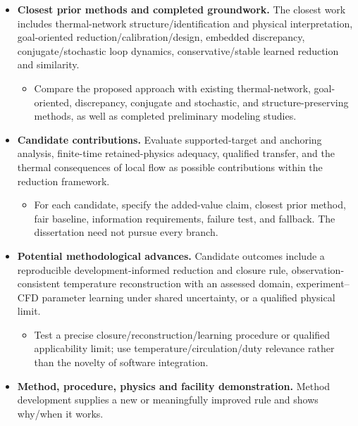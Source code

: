 \begin{itemize}[leftmargin=*]
\item {}\textbf{Closest prior methods and completed groundwork.} The closest work includes thermal-network structure/\allowbreak{}identification and physical interpretation, goal-oriented reduction/\allowbreak{}calibration/\allowbreak{}design, embedded discrepancy, conjugate/\allowbreak{}stochastic loop dynamics, conservative/\allowbreak{}stable learned reduction and similarity.\cite{fierro2026cfdoneD,raue2009identifiability}
\begin{itemize}
\item Compare the proposed approach with existing thermal-network, goal-oriented, discrepancy, conjugate and stochastic, and structure-preserving methods, as well as completed preliminary modeling studies.
\end{itemize}
\item {}\textbf{Candidate contributions.} Evaluate supported-target and anchoring analysis, finite-time retained-physics adequacy, qualified transfer, and the thermal consequences of local flow as possible contributions within the reduction framework.
\begin{itemize}
\item For each candidate, specify the added-value claim, closest prior method, fair baseline, information requirements, failure test, and fallback. The dissertation need not pursue every branch.
\end{itemize}
\item {}\textbf{Potential methodological advances.} Candidate outcomes include a reproducible development-informed reduction and closure rule, observation-consistent temperature reconstruction with an assessed domain, experiment--CFD parameter learning under shared uncertainty, or a qualified physical limit.
\begin{itemize}
\item Test a precise closure/\allowbreak{}reconstruction/\allowbreak{}learning procedure or qualified applicability limit; use temperature/\allowbreak{}circulation/\allowbreak{}duty relevance rather than the novelty of software integration.
\end{itemize}
\item {}\textbf{Method, procedure, physics and facility demonstration.} Method development supplies a new or meaningfully improved rule and shows why/\allowbreak{}when it works.

\end{itemize}
